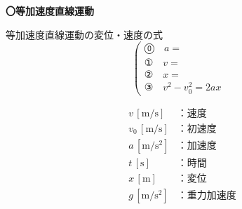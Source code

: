 \documentclass[11pt,twoside,fleqn]{article}
\begin{document}
\begin{itembox}[l]{\textbf{〇等加速度直線運動}}
	\begin{minipage}[t]{0.70\linewidth}
	等加速度直線運動の変位・速度の式
	\Large
	\[
	\left(
	\begin{array}{ll}
		\text{⓪} \quad a = & \\
		\text{①} \quad v = & \\
		\text{②} \quad x = & \\
		\text{③} \quad v^2 - v_0^2 = 2ax &
	\end{array}
	\right.
	\]
	\begin{center}
	\end{center}	
	\end{minipage}
	\hfill
	\begin{minipage}[t]{0.26\linewidth}
		\begin{shadebox}
			\begin{align*}
				v\,[\si{\metre\per\second}] &\text{：速度} \\
				v_0\,[\si{\metre\per\second}] &\text{：初速度} \\
				a\,[\si{\metre\per\second\squared}] &\text{：加速度} \\
				t\,[\si{\second}] &\text{：時間} \\
				x\,[\si{\metre}] &\text{：変位} \\
				g\,[\si{\metre\per\second\squared}] &\text{：重力加速度}\\
			\end{align*}
		\end{shadebox}
	\end{minipage}
\end{itembox}
\end{document}
